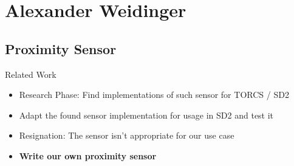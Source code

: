 \documentclass[aspectratio=169]{beamer}
\begin{document}
  \section{Alexander Weidinger}
  \subsection{Proximity Sensor}
  \begin{frame}{Related Work}
    \begin{itemize}
      \item<1-> Research Phase: Find implementations of such sensor for TORCS / SD2
      \item<2-> Adapt the found sensor implementation for usage in SD2 and test it
      \item<3-> Resignation: The sensor isn't appropriate for our use case
      \item<4-> \textbf{Write our own proximity sensor}
    \end{itemize}
  \end{frame}
\end{document}
